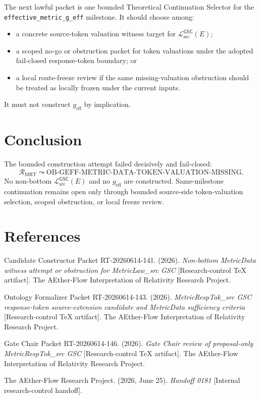 \documentclass[11pt]{article}
\newcommand{\MetricData}{\mathcal{L}_{\mathrm{src}}^{\mathsf{GSC}}}
\newcommand{\geff}{g_{\mathrm{eff}}}
\begin{document}
The next lawful packet is one bounded Theoretical Continuation Selector for
the \texttt{effective\_metric\_g\_eff} milestone. It should choose among:
\begin{itemize}[leftmargin=*]
  \item a concrete source-token valuation witness target for
  \(\MetricData(E)\);
  \item a scoped no-go or obstruction packet for token valuations under the
  adopted fail-closed response-token boundary; or
  \item a local route-freeze review if the same missing-valuation obstruction
  should be treated as locally frozen under the current inputs.
\end{itemize}

It must not construct \(\geff\) by implication.

\section{Conclusion}

The bounded construction attempt failed decisively and fail-closed:
\[
  \mathcal{R}_{\mathrm{MRT}}
  \leadsto
  \mathrm{OB\mbox{-}GEFF\mbox{-}METRIC\mbox{-}DATA\mbox{-}TOKEN\mbox{-}VALUATION\mbox{-}MISSING}.
\]
No non-bottom \(\MetricData(E)\) and no \(\geff\) are constructed.
Same-milestone continuation remains open only through bounded source-side
token-valuation selection, scoped obstruction, or local freeze review.

\section*{References}

Candidate Constructor Packet RT-20260614-141. (2026). \textit{Non-bottom
MetricData witness attempt or obstruction for MetricLaw\_src GSC}
[Research-control TeX artifact]. The AEther-Flow Interpretation of Relativity
Research Project.

Ontology Formalizer Packet RT-20260614-143. (2026). \textit{MetricRespTok\_src
GSC response-token source-extension candidate and MetricData sufficiency
criteria} [Research-control TeX artifact]. The AEther-Flow Interpretation of
Relativity Research Project.

Gate Chair Packet RT-20260614-146. (2026). \textit{Gate Chair review of
proposal-only MetricRespTok\_src GSC} [Research-control TeX artifact]. The
AEther-Flow Interpretation of Relativity Research Project.

The AEther-Flow Research Project. (2026, June 25). \textit{Handoff 0181}
[Internal research-control handoff].
\end{document}
